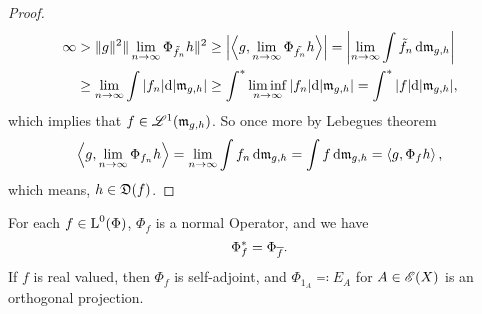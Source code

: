 \begin{proof}
 \begin{align*}
   \infty &> \|g\|^2 \| \lim_{n \to \infty} \Phi_{\tilde{f}_n}h \|^2 \geq
   \left|\left\langle g, \lim_{n \to \infty} \Phi_{\tilde{f_n}} h \right\rangle \right| =
   \left|\lim_{n \to \infty} \int \tilde{f}_n \operatorname{d}\! \mathfrak{m}_{g,h} \right| \\
	  &\geq \lim_{n \to \infty} \int |f_n| \text{d}  |\mathfrak{m}_{g,h}| 
	  \geq \int ^{*} \liminf_{n \to \infty} |f_n| \text{d}  |\mathfrak{m}_{g,h}| 
	  = \int ^{*} |f| \text{d}  |\mathfrak{m}_{g,h}|,
 \end{align*}
 which implies that $f \in \mathscr{L}^1(\mathfrak{m}_{g,h})$. 
 So once more by Lebegues theorem
 \[
 \left\langle g, \lim_{n \to \infty} \Phi_{f_n} h  \right\rangle = 
 \lim_{n \to \infty} \int f_n \operatorname{d}\! \mathfrak{m}_{g,h} = \int f \operatorname{d}\! \mathfrak{m}_{g,h}
 =\left\langle g, \Phi_f h \right\rangle,
 \]
which means, $h \in \mathfrak{D}(f)$. 


\end{proof}




\begin{lem}
  \label{maintheorem3}
 For each $f \in {\text{L}^0}(\Phi)$, $\Phi_f$ is a normal Operator, and we have
\[
\Phi_f ^{*} = \Phi_{\overline{f}}. 
\]
If $f$ is real valued, then $\Phi_f$ is self-adjoint, and $\Phi_{1_A} 
\eqqcolon E_A$ for $ A \in \mathscr{E}(X)$ is an orthogonal projection. 
\end{lem}


